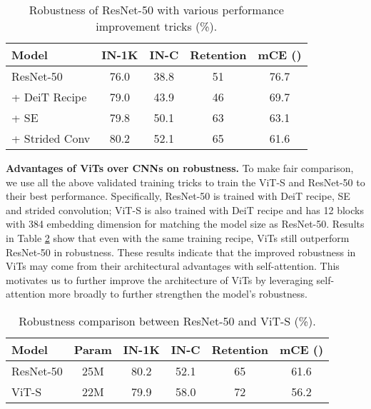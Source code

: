 \documentclass[nohyperref]{article}
\theoremstyle{plain}
\theoremstyle{definition}
\theoremstyle{remark}
\begin{document}
\begin{table}[h]
    \small
    \caption{Robustness of ResNet-50 with various performance improvement tricks (\%).}
    \label{tab:cnn_impact}
    \vspace{2mm}
    \setlength{\tabcolsep}{2pt}
    \centering
    \begin{tabular}{l|cccc}  
    Model &IN-1K   &IN-C    & Retention& mCE ()  
    \\ 
    \midrule 
    ResNet-50 &  76.0 & 38.8 &  51  &  76.7   
    \\  
    \quad + DeiT Recipe &  79.0  & 43.9 &     46 & 69.7     
    \\ 
    \quad + SE &  79.8  & 50.1 &     63 & 63.1    
    \\ 
    \quad + Strided Conv &  80.2  & 52.1 &     65 & 61.6     
    \vspace{-3mm}
    \end{tabular}
\end{table}

\textbf{Advantages of ViTs over CNNs on robustness.} To make fair comparison, we use all the above validated training tricks to train the ViT-S and ResNet-50 to their best performance. Specifically, ResNet-50 is trained with DeiT recipe, SE and strided convolution; ViT-S is also trained with DeiT recipe and has 12 blocks with 384 embedding dimension for matching the model size as ResNet-50. Results in Table \ref{tab:robustness_compare_vit_cnn} show that even with the same training recipe, ViTs still outperform ResNet-50 in robustness. These results indicate that the improved robustness in ViTs may come from their architectural advantages with self-attention. This motivates us to further improve the architecture of ViTs by leveraging self-attention more broadly to further strengthen the model's robustness.
\vspace{-4mm}
\begin{table}[h]
    \small
    \caption{Robustness comparison between ResNet-50 and ViT-S (\%).}
    \label{tab:robustness_compare_vit_cnn}
    \vspace{2mm}
    \centering
    \setlength{\tabcolsep}{4pt}
    \begin{tabular}{l|c|cccc}  
Model      & Param & IN-1K     & IN-C  &  Retention & mCE () \\
    \midrule
    ResNet-50& 25M &  80.2  & 52.1 &  65  & 61.6       \\  
    ViT-S& 22M  & 79.9    & 58.0 &  72  & 56.2      \\ 
    
    \end{tabular}
\end{table}
\end{document}
